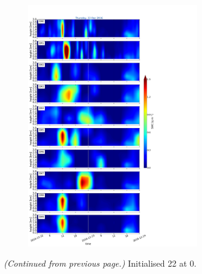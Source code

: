 \begin{figure}[h]%
	\centering
	\begin{subfigure}[t]{\textwidth} 
		\centering
		\includegraphics[trim={0cm 0cm 18.3cm 5.1cm},clip,width=0.8\textwidth]{./fig_09EM/20161222}
		\caption{}\label{fig:EM09_22}
	\end{subfigure}
    \caption{\textit{(Continued from previous page.)} Initialised \SI{22}{\dec} at \SI{0}{\UTC}. } 
\end{figure}
